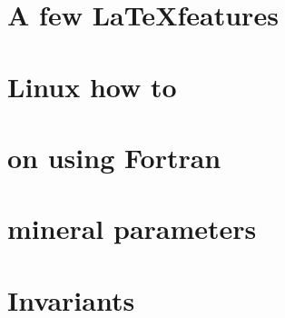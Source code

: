\documentclass[a4paper]{article}
\numberwithin{equation}{section}
\begin{document}
\section{A few \LaTeX features}  %
\newpage %
\section{Linux how to}  %
\newpage %
\section{on using Fortran}  %
\newpage %
\section{mineral parameters}  %
\newpage %
\section{Invariants \label{app:invariants}}  %




\newpage %
\newpage %

\newpage %
\listoftodos[Notes] %

\printbibliography
\end{document}
